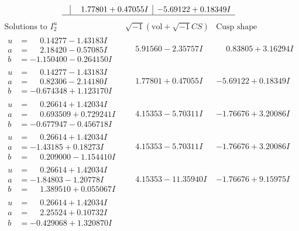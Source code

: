 \documentclass[1p]{elsarticle_modified}
\theoremstyle{definition}
\newcommand{\I}{\sqrt{-1}}
\begin{document}
$$\begin{array}{c|c|c}
 & \phantom{-}1.77801 + 0.47055 I & -5.69122 + 0.18349 I\\
 \hline 
 \end{array}$$\newpage$$\begin{array}{c|c|c}  
\text{Solutions to }I^u_{2}& \I (\text{vol} + \sqrt{-1}CS) & \text{Cusp shape}\\
 \hline 
\begin{aligned}
u &= \phantom{-}0.14277 - 1.43183 I \\
a &= \phantom{-}2.18420 - 0.57085 I \\
b &= -1.150400 - 0.264150 I\end{aligned}
 & \phantom{-}5.91560 - 2.35757 I & \phantom{-}0.83805 + 3.16294 I \\ \hline\begin{aligned}
u &= \phantom{-}0.14277 - 1.43183 I \\
a &= \phantom{-}0.82306 - 2.14180 I \\
b &= -0.674348 + 1.123170 I\end{aligned}
 & \phantom{-}1.77801 + 0.47055 I & -5.69122 + 0.18349 I \\ \hline\begin{aligned}
u &= \phantom{-}0.26614 + 1.42034 I \\
a &= \phantom{-}0.693509 + 0.729241 I \\
b &= -0.677947 - 0.456718 I\end{aligned}
 & \phantom{-}4.15353 - 5.70311 I & -1.76676 + 3.20086 I \\ \hline\begin{aligned}
u &= \phantom{-}0.26614 + 1.42034 I \\
a &= -1.43185 + 0.18273 I \\
b &= \phantom{-}0.209000 - 1.154410 I\end{aligned}
 & \phantom{-}4.15353 - 5.70311 I & -1.76676 + 3.20086 I \\ \hline\begin{aligned}
u &= \phantom{-}0.26614 + 1.42034 I \\
a &= -1.84803 - 1.20778 I \\
b &= \phantom{-}1.389510 + 0.055067 I\end{aligned}
 & \phantom{-}4.15353 - 11.35940 I & -1.76676 + 9.15975 I \\ \hline\begin{aligned}
u &= \phantom{-}0.26614 + 1.42034 I \\
a &= \phantom{-}2.25524 + 0.10732 I \\
b &= -0.429068 + 1.320870 I\end{aligned}

\end{array}$$
\end{document}
